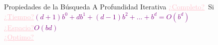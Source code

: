 \begin{frame}{Propiedades de la Búsqueda A Profundidad Iterativa}
	\small{	
            \textcolor{Pink}{\underline{¿Completo?}}\, Si
            \\
            \textcolor{Pink}{\underline{¿Tiempo?}}\;\textcolor{Purple}{$(d+ 1)b^0+db^1+ (d-1)b^2 + ... + b^d= O(b^d)$}
            \\
            \textcolor{Pink}{\underline{¿Espacio?}}\;\textcolor{Purple}{$O(bd)$}
            \\
            \textcolor{Pink}{\underline{¿Optimo?}}\,
            \\
    }
\end{frame}
